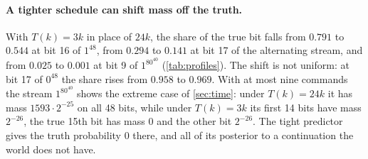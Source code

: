 \paragraph{A tighter schedule can shift mass off the truth.} With $T(k)=3k$ in place of $24k$, the share of
the true bit falls from $0.791$ to $0.544$ at bit 16 of $1^{48}$, from $0.294$ to $0.141$ at bit 17 of the
alternating stream, and from $0.025$ to $0.001$ at bit 9 of $1^80^{40}$ (\cref{tab:profiles}). The shift is
not uniform: at bit 17 of $0^{48}$ the share rises from $0.958$ to $0.969$. With at most nine commands the
stream $1^80^{40}$ shows the extreme case of \cref{sec:time}: under $T(k)=24k$ it has mass $1593\cdot2^{-25}$
on all 48 bits, while under $T(k)=3k$ its first 14 bits have mass $2^{-26}$, the true 15th bit has mass $0$
and the other bit $2^{-26}$. The tight predictor gives the truth probability $0$ there, and all of its
posterior to a continuation the world does not have.
